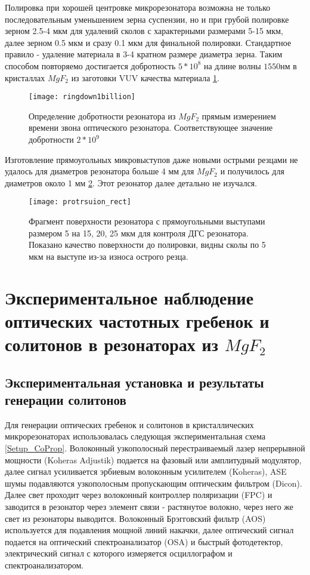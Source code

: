 Полировка при хорошей центровке микрорезонатора возможна не только последовательным уменьшением зерна суспензии, но и при грубой полировке зерном 2.5-4 мкм для удалений сколов с характерными размерами 5-15 мкм, далее зерном 0.5 мкм и сразу 0.1 мкм для финальной полировки. Стандартное правило - удаление материала в 3-4 кратном размере диаметра зерна. Таким способом повторяемо достигается добротность $5*10^8$ на длине волны $1550 нм$ в кристаллах $MgF_2$ из заготовки VUV качества материала \ref{ringdown}.

\begin{figure}[ht]
\centering
  \texttt{[image: ringdown1billion]}
  \caption{Определение добротности резонатора из $MgF_2$ прямым измерением времени звона оптического резонатора. Соответствующее значение добротности $2*10^9$}
  \label{ringdown}
\end{figure}


Изготовление прямоугольных микровыступов даже новыми острыми резцами не удалось для диаметров резонатора больше 4 мм для $MgF_2$ и получилось для диаметров около 1 мм \ref{protrsuion_rect}. Этот резонатор далее детально не изучался.

\begin{figure}[ht]
\centering
  \texttt{[image: protrsuion\_rect]}
  \caption{Фрагмент поверхности резонатора с прямоугольными выступами размером 5 на 15, 20, 25 мкм для контроля ДГС резонатора. Показано качество поверхности до полировки, видны сколы по 5 мкм на выступе из-за износа острого резца.}
  \label{protrsuion_rect}
\end{figure}

\section{Экспериментальное наблюдение оптических частотных гребенок и солитонов в резонаторах из $MgF_2$}


\subsection{Экспериментальная установка и результаты генерации солитонов}

Для генерации оптических гребенок и солитонов в кристаллических микрорезонаторах использовалась следующая экспериментальная схема \ref{Setup_CoProp}. Волоконный узкополосный перестраиваемый лазер непрерывной мощности (Koheras Adjustik) подается на фазовый или амплитудный модулятор, далее сигнал усиливается эрбиевым волоконным усилителем (Koheras), ASE шумы подавляются узкополосным пропускающим оптическим фильтром (Dicon). Далее свет проходит через волоконный контроллер поляризации (FPC) и заводится в резонатор через элемент связи - растянутое волокно, через него же свет из резонаторы выводится. Волоконный Брэгговский фильтр (AOS) используется для подавления мощной линий накачки, далее оптический сигнал подается на оптический спектроанализатор (OSA) и быстрый фотодетектор, электрический сигнал с которого измеряется осциллографом и спектроанализатором.

